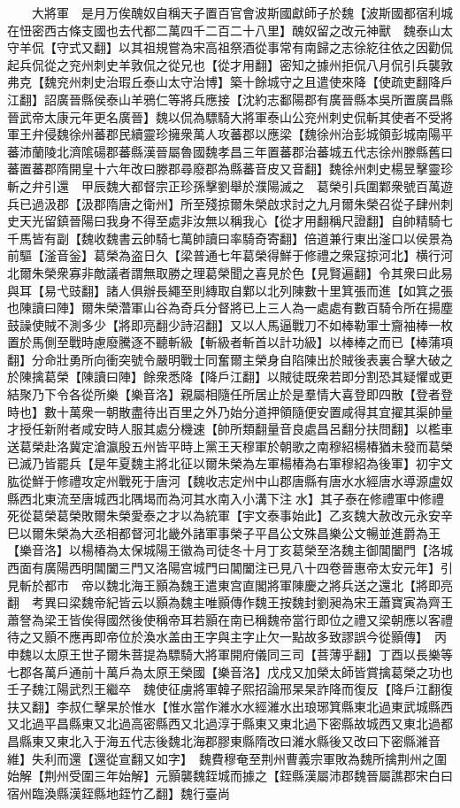 　　大將軍　是月万俟醜奴自稱天子置百官會波斯國獻師子於魏【波斯國都宿利城在忸密西古條支國也去代都二萬四千二百二十八里】醜奴留之改元神獸　魏泰山太守羊侃【守式又翻】以其祖規嘗為宋高祖祭酒從事常有南歸之志徐紇往依之因勸侃起兵侃從之兖州刺史羊敦侃之從兄也【從才用翻】密知之據州拒侃八月侃引兵襲敦弗克【魏兖州刺史治瑕丘泰山太守治博】築十餘城守之且遣使來降【使疏吏翻降戶江翻】詔廣晉縣侯泰山羊鴉仁等將兵應接【沈約志鄱陽郡有廣晉縣本吳所置廣昌縣晉武帝太康元年更名廣晉】魏以侃為驃騎大將軍泰山公兖州刺史侃斬其使者不受將軍王弁侵魏徐州蕃郡民續靈珍擁衆萬人攻蕃郡以應梁【魏徐州治彭城領彭城南陽平蕃沛蘭陵北濟隂碭郡蕃縣漢晉屬魯國魏孝昌三年置蕃郡治蕃城五代志徐州滕縣舊曰蕃置蕃郡隋開皇十六年改曰滕郡尋廢郡為縣蕃音皮又音翻】魏徐州刺史楊昱擊靈珍斬之弁引還　甲辰魏大都督宗正珍孫擊劉舉於濮陽滅之　葛榮引兵圍鄴衆號百萬遊兵已過汲郡【汲郡隋唐之衛州】所至殘掠爾朱榮啟求討之九月爾朱榮召從子肆州刺史天光留鎮晉陽曰我身不得至處非汝無以稱我心【從才用翻稱尺證翻】自帥精騎七千馬皆有副【魏收魏書云帥騎七萬帥讀曰率騎奇寄翻】倍道兼行東出滏口以侯景為前驅【滏音釡】葛榮為盗日久【梁普通七年葛榮得鮮于修禮之衆寇掠河北】横行河北爾朱榮衆寡非敵議者謂無取勝之理葛榮聞之喜見於色【見賢遍翻】令其衆曰此易與耳【易弋豉翻】諸人俱辦長繩至則縳取自鄴以北列陳數十里箕張而進【如箕之張也陳讀曰陣】爾朱榮濳軍山谷為奇兵分督將已上三人為一處處有數百騎令所在揚塵鼓譟使賊不測多少【將即亮翻少詩沼翻】又以人馬逼戰刀不如棒勒軍士齎袖棒一枚置於馬側至戰時慮廢騰逐不聽斬級【斬級者斬首以計功級】以棒棒之而已【棒蒲項翻】分命壯勇所向衝突號令嚴明戰士同奮爾主榮身自陷陳出於賊後表裏合擊大破之於陳擒葛榮【陳讀曰陣】餘衆悉降【降戶江翻】以賊徒既衆若即分割恐其疑懼或更結聚乃下令各從所樂【樂音洛】親屬相隨任所居止於是羣情大喜登即四散【登者登時也】數十萬衆一朝散盡待出百里之外乃始分道押領隨便安置咸得其宜擢其渠帥量才授任新附者咸安時人服其處分機速【帥所類翻量音良處昌呂翻分扶問翻】以檻車送葛榮赴洛冀定滄瀛殷五州皆平時上黨王天穆軍於朝歌之南穆紹楊椿猶未發而葛榮已滅乃皆罷兵【是年夏魏主將北征以爾朱榮為左軍楊椿為右軍穆紹為後軍】初宇文肱從鮮于修禮攻定州戰死于唐河【魏收志定州中山郡唐縣有唐水水經唐水導源盧奴縣西北東流至唐城西北隅堨而為河其水南入小溝下注水】其子泰在修禮軍中修禮死從葛榮葛榮敗爾朱榮愛泰之才以為統軍【宇文泰事始此】乙亥魏大赦改元永安辛巳以爾朱榮為大丞相都督河北畿外諸軍事榮子平昌公文殊昌樂公文暢並進爵為王【樂音洛】以楊椿為太保城陽王徽為司徒冬十月丁亥葛榮至洛魏主御閶闔門【洛城西面有廣陽西明閶闔三門又洛陽宫城門曰閶闔注已見八十四卷晉惠帝太安元年】引見斬於都市　帝以魏北海王顥為魏王遣東宫直閣將軍陳慶之將兵送之還北【將即亮翻　考異曰梁魏帝紀皆云以顥為魏主唯顥傳作魏王按魏封劉昶為宋王蕭寶寅為齊王蕭詧為梁王皆俟得國然後使稱帝耳若顥在南已稱魏帝當行即位之禮又梁朝應以客禮待之又顥不應再即帝位於渙水盖由王字與主字止欠一點故多致謬誤今從顥傳】　丙申魏以太原王世子爾朱菩提為驃騎大將軍開府儀同三司【菩薄乎翻】丁酉以長樂等七郡各萬戶通前十萬戶為太原王榮國【樂音洛】戊戍又加榮太師皆賞擒葛榮之功也　壬子魏江陽武烈王繼卒　魏使征虜將軍韓子熙招論邢杲杲詐降而復反【降戶江翻復扶又翻】李叔仁擊杲於惟水【惟水當作濰水水經濰水出琅琊箕縣東北過東武城縣西又北過平昌縣東又北過高密縣西又北過淳于縣東又東北過下密縣故城西又東北過都昌縣東又東北入于海五代志後魏北海郡膠東縣隋改曰濰水縣後又改曰下密縣濰音維】失利而還【還從宣翻又如字】　魏費穆奄至荆州曹義宗軍敗為魏所擒荆州之圍始解【荆州受圍三年始解】元顥襲魏銍城而據之【銍縣漢屬沛郡魏晉屬譙郡宋白曰宿州臨渙縣漢銍縣地銍竹乙翻】魏行臺尚